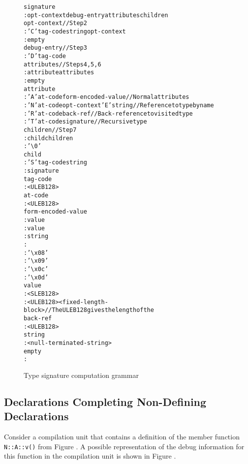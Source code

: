 \begin{figure}[ht]
\begin{dwflisting}
\begin{alltt}
signature
    : opt-context debug-entry attributes children
opt-context               // Step 2
    : 'C' tag-code string opt-context
    : empty
debug-entry               // Step 3
    : 'D' tag-code
attributes                // Steps 4, 5, 6
    : attribute attributes
    : empty
attribute
    : 'A' at-code form-encoded-value     // Normal attributes
    : 'N' at-code opt-context 'E' string // Reference to type by name
    : 'R' at-code back-ref               // Back-reference to visited type
    : 'T' at-code signature              // Recursive type
children                 //  Step 7
    : child children
    : '\textbackslash{}0'
child
    : 'S' tag-code string
    : signature
tag-code
    : <ULEB128>
at-code
    : <ULEB128>
form-encoded-value
    : \DWFORMsdata value 
    : \DWFORMflag value 
    : \DWFORMstring string 
    : \DWFORMblock {} 
\DWFORMstring {}
    : '\textbackslash{}x08'
\DWFORMblock  {}
    : '\textbackslash{}x09'
\DWFORMflag {}
    : '\textbackslash{}x0c'
\DWFORMsdata {}
    : '\textbackslash{}x0d'
value
    : <SLEB128>
    : <ULEB128> <fixed-length-block> // The ULEB128 gives the length of the 
back-ref
    : <ULEB128>
string
    : <null-terminated-string>
empty
    :
\end{alltt}
\end{dwflisting}
\caption{Type signature computation grammar}
\label{fig:typesignaturecomputationgrammar}
\end{figure}

\clearpage
\subsection{Declarations Completing Non-Defining Declarations}
\label{app:declarationscompletingnondefiningdeclarations}
Consider a compilation unit that contains a definition of the member
function \texttt{N::A::v()} from 
Figure . 
A possible representation of the
debug information for this function in the compilation unit is shown
in Figure .

